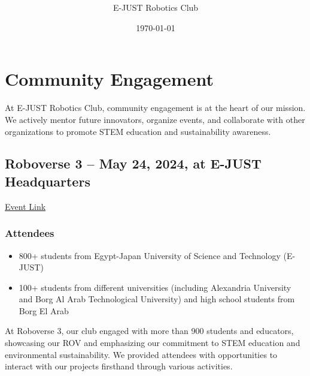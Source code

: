 \documentclass[11pt, twocolumn]{article}
\title{\Huge \color{mypink3}{ROV Document}  \vspace{0.5cm}}
\author{\Large E-JUST Robotics Club \normalsize \hspace{0.5cm} }
\date{\today}
\begin{document}
\onecolumn

\tableofcontents
\clearpage

\section{Community Engagement}
At E-JUST Robotics Club, community engagement is at the heart of our mission. We actively mentor future innovators, organize events, and collaborate with other organizations to promote STEM education and sustainability awareness.

\subsection{Roboverse 3 – May 24, 2024, at E-JUST Headquarters}
\href{https://fb.me/e/3yvYdIh8P/}{Event Link}

\subsubsection{Attendees}
\begin{itemize}
    \item 800+ students from Egypt-Japan University of Science and Technology (E-JUST)
    \item 100+ students from different universities (including Alexandria University and Borg Al Arab Technological University) and high school students from Borg El Arab
\end{itemize}

At Roboverse 3, our club engaged with more than 900 students and educators, showcasing our ROV and emphasizing our commitment to STEM education and environmental sustainability. We provided attendees with opportunities to interact with our projects firsthand through various activities.
\end{document}
